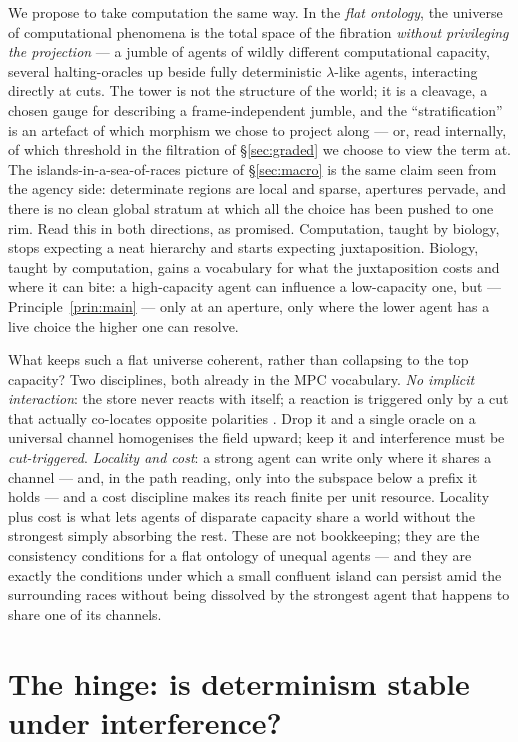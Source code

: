 \documentclass[11pt]{article}
\theoremstyle{definition}
\theoremstyle{plain}
\theoremstyle{remark}
\begin{document}
We propose to take computation the same way. In the \emph{flat ontology}, the universe
of computational phenomena is the total space of the fibration \emph{without privileging
the projection} --- a jumble of agents of wildly different computational capacity,
several halting-oracles up beside fully deterministic $\lambda$-like agents,
interacting directly at cuts. The tower is not the structure of the world; it is a
cleavage, a chosen gauge for describing a frame-independent jumble, and the
``stratification'' is an artefact of which morphism we chose to project along --- or, read
internally, of which threshold in the filtration of \S\ref{sec:graded} we choose to view the term
at. The
islands-in-a-sea-of-races picture of \S\ref{sec:macro} is the same claim seen from the
agency side: determinate regions are local and sparse, apertures pervade, and there is no
clean global stratum at which all the choice has been pushed to one rim. Read this in
both directions, as promised. Computation, taught by biology, stops expecting a neat
hierarchy and starts expecting juxtaposition. Biology, taught by computation, gains a
vocabulary for what the juxtaposition costs and where it can bite: a high-capacity agent
can influence a low-capacity one, but --- Principle~\ref{prin:main} --- only at an
aperture, only where the lower agent has a live choice the higher one can resolve.

What keeps such a flat universe coherent, rather than collapsing to the top capacity?
Two disciplines, both already in the MPC vocabulary. \emph{No implicit interaction}: the
store never reacts with itself; a reaction is triggered only by a cut that actually
co-locates opposite polarities \cite{paths}. Drop it and a single oracle on a universal
channel homogenises the field upward; keep it and interference must be \emph{cut-triggered}.
\emph{Locality and cost}: a strong agent can write only where it shares a channel ---
and, in the path reading, only into the subspace below a prefix it holds --- and a cost
discipline makes its reach finite per unit resource. Locality plus cost is what lets
agents of disparate capacity share a world without the strongest simply absorbing the
rest. These are not bookkeeping; they are the consistency conditions for a flat ontology
of unequal agents --- and they are exactly the conditions under which a small confluent
island can persist amid the surrounding races without being dissolved by the strongest
agent that happens to share one of its channels.

\section{The hinge: is determinism stable under interference?}\label{sec:crux}
\end{document}
